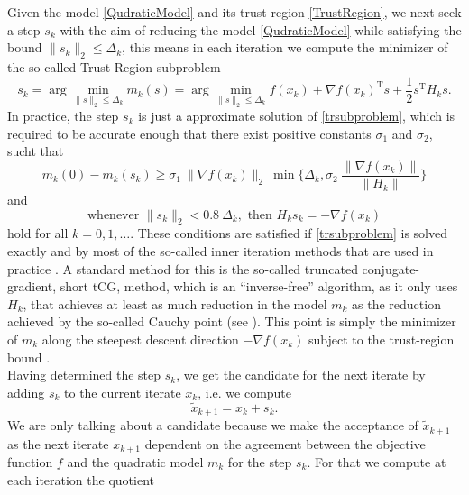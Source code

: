 Given the model \cref{QudraticModel} and its trust-region \cref{TrustRegion}, we next seek a step $s_k$ with the aim of reducing the model \cref{QudraticModel} while satisfying the bound $\lVert s_k \rVert_2 \leq \Delta_k$, this means in each iteration we compute the minimizer of the so-called Trust-Region subproblem
\begin{equation}\label{trsubproblem}
    s_k = \arg \min_{\lVert s \rVert_2 \leq \Delta_k} m_k(s) = \arg \min_{\lVert s \rVert_2 \leq \Delta_k} f(x_k) + \nabla f(x_k)^{\mathrm{T}} s + \frac{1}{2} s^{\mathrm{T}} H_k s.
\end{equation}
In practice, the step $s_k$ is just a approximate solution of \cref{trsubproblem}, which is required to be accurate enough that there exist positive constants $\sigma_1$ and $\sigma_2$, sucht that 
\begin{equation}\label{accuracy1}
    m_k(0) - m_k(s_k) \geq \sigma_1 \ \lVert \nabla f(x_k) \rVert_2 \ \min \{ \Delta_k, \sigma_2 \ \frac{\lVert \nabla f(x_k) \rVert}{\lVert H_k \rVert} \} 
\end{equation} 
and
\begin{equation}\label{accuracy2}
    \text{whenever } \lVert s_k \rVert_2 < 0.8 \ \Delta_k, \text{ then } H_k s_k = - \nabla f(x_k)
\end{equation}
hold for all $k = 0, 1, \ldots$. These conditions are satisfied if \cref{trsubproblem} is solved exactly and by most of the so-called inner iteration methods that are used in practice \cite[p.~1027]{ByrdKhalfanSchnabel:1996}. A standard method for this is the so-called truncated conjugate-gradient, short tCG, method, which is an “inverse-free” algorithm, as it only uses $H_k$, that achieves at least as much reduction in the model $m_k$ as the reduction achieved by the so-called Cauchy point (see \cite[4.1~Algorithms~based~on~the~cauchy~point]{NocedalWright:2006}). This point is simply the minimizer of $m_k$ along the steepest descent direction $- \nabla f(x_k)$ subject to the trust-region bound \cite[p.~71]{NocedalWright:2006}. \\
Having determined the step $s_k$, we get the candidate for the next iterate by adding $s_k$ to the current iterate $x_k$, i.e. we compute 
\begin{equation}\label{candidate}
    \widetilde{x}_{k+1} = x_k + s_k.
\end{equation}
We are only talking about a candidate because we make the acceptance of $\widetilde{x}_{k+1}$ as the next iterate $x_{k+1}$ dependent on the agreement between the objective function $f$ and the quadratic model $m_k$ for the step $s_k$. For that we compute at each iteration the quotient
